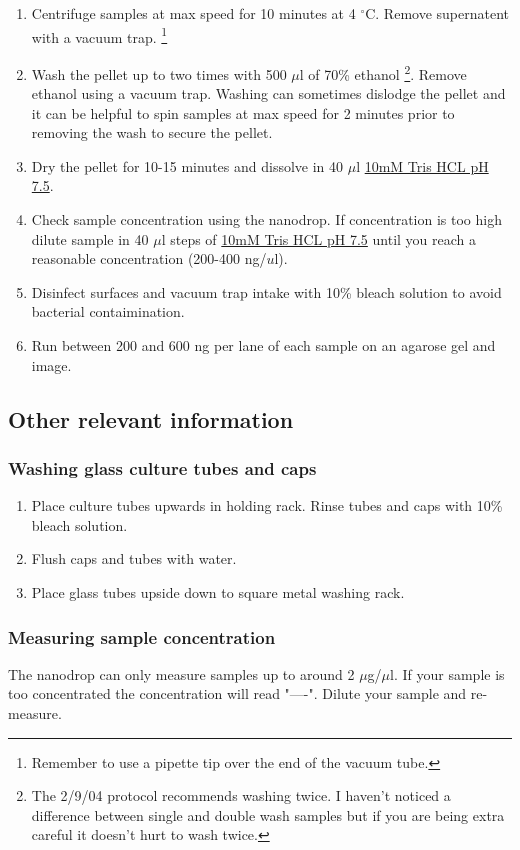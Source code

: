 \documentclass[12pt]{article}
\theoremstyle{definition}
\begin{document}
\begin{enumerate}
	\item Centrifuge samples at max speed for 10 minutes at 4  $^{\circ}$C. Remove supernatent with a vacuum trap. \footnote{Remember to use a pipette tip over the end of the vacuum tube.}
	
	\item Wash the pellet up to two times with 500 $\mu$l of 70\% ethanol \footnote{The 2/9/04 protocol recommends washing twice. I haven't noticed a difference between single and double wash samples but if you are being extra careful it doesn't hurt to wash twice.}. Remove ethanol using a vacuum trap. Washing can sometimes dislodge the pellet and it can be helpful to spin samples at max speed for 2 minutes prior to removing the wash to secure the pellet.
	
	\item Dry the pellet for 10-15 minutes and dissolve in 40 $\mu$l \hyperref[sec:tris]{10mM Tris HCL pH 7.5}. 
	
	\item Check sample concentration using the nanodrop. If concentration is too high dilute sample in 40 $\mu$l steps of \hyperref[sec:tris]{10mM Tris HCL pH 7.5} until you reach a reasonable concentration (200-400 ng/$u$l).
	
	\item Disinfect surfaces and vacuum trap intake with 10\% bleach solution to avoid bacterial contaimination.
	
	\item Run between 200 and 600 ng per lane of each sample on an agarose gel and image.


\end{enumerate}

\subsection*{Other relevant information}

\subsubsection*{Washing glass culture tubes and caps}

\begin{enumerate}
	\item Place culture tubes upwards in holding rack. Rinse tubes and caps with 10\% bleach solution.
	\item Flush caps and tubes with water.
	\item Place glass tubes upside down to square metal washing rack.
\end{enumerate}

\subsubsection*{Measuring sample concentration}

The nanodrop can only measure samples up to around 2 $\mu$g/$\mu$l. If your sample is too concentrated the concentration will read "----". Dilute your sample and re-measure.
\end{document}
